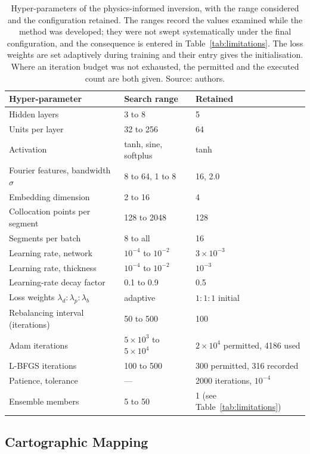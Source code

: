\documentclass[final]{agujournal2019}
\begin{document}
\begin{table}\centering
  \caption{Hyper-parameters of the physics-informed inversion, with the range
  considered and the configuration retained. The ranges record the values
  examined while the method was developed; they were not swept systematically
  under the final configuration, and the consequence is entered in
  Table~\ref{tab:limitations}. The loss weights are set adaptively
  during training and their entry gives the initialisation. Where an iteration
  budget was not exhausted, the permitted and the executed count are both
  given. Source: authors.}\label{tab:hyperparams}
  \begin{tabular}{lll}
    \toprule
    Hyper-parameter & Search range & Retained \\
    \midrule
    Hidden layers & 3 to 8 & 5 \\
    Units per layer & 32 to 256 & 64 \\
    Activation & tanh, sine, softplus & tanh \\
    Fourier features, bandwidth $\sigma$ & 8 to 64, 1 to 8 & 16, 2.0 \\
    Embedding dimension & 2 to 16 & 4 \\
    Collocation points per segment & 128 to 2048 & 128 \\
    Segments per batch & 8 to all & 16 \\
    Learning rate, network & $10^{-4}$ to $10^{-2}$ & $3\times10^{-3}$ \\
    Learning rate, thickness & $10^{-4}$ to $10^{-2}$ & $10^{-3}$ \\
    Learning-rate decay factor & 0.1 to 0.9 & 0.5 \\
    Loss weights $\lambda_d:\lambda_p:\lambda_b$ & adaptive & $1:1:1$ initial \\
    Rebalancing interval (iterations) & 50 to 500 & 100 \\
    Adam iterations & $5\times10^{3}$ to $5\times10^{4}$ & $2\times10^{4}$ permitted, 4186 used \\
    L-BFGS iterations & 100 to 500 & 300 permitted, 316 recorded \\
    Patience, tolerance & --- & 2000 iterations, $10^{-4}$ \\
    Ensemble members & 5 to 50 & 1 (see Table~\ref{tab:limitations}) \\
    \bottomrule
  \end{tabular}
\end{table}

\subsection{Cartographic Mapping}\label{sec:mapping}
\end{document}
